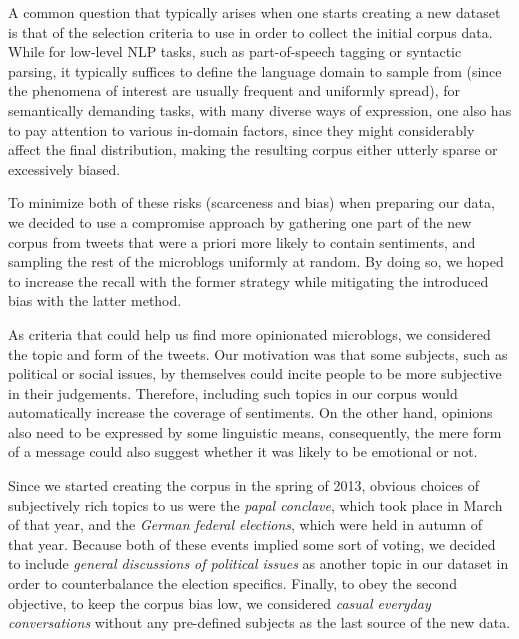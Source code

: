 A common question that typically arises when one starts creating a new
dataset is that of the selection criteria to use in order to collect
the initial corpus data.  While for low-level NLP tasks, such as
part-of-speech tagging or syntactic parsing, it typically suffices to
define the language domain to sample from (since the phenomena of
interest are usually frequent and uniformly spread), for semantically
demanding tasks, with many diverse ways of expression, one also has to
pay attention to various in-domain factors, since they might
considerably affect the final distribution, making the resulting
corpus either utterly sparse or excessively biased.

To minimize both of these risks (scarceness and bias) when preparing
our data, we decided to use a compromise approach by gathering one
part of the new corpus from tweets that were a priori more likely to
contain sentiments, and sampling the rest of the microblogs uniformly
at random.  By doing so, we hoped to increase the recall with the
former strategy while mitigating the introduced bias with the latter
method.

As criteria that could help us find more opinionated microblogs, we
considered the topic and form of the tweets.  Our motivation was that
some subjects, such as political or social issues, by themselves could
incite people to be more subjective in their judgements.  Therefore,
including such topics in our corpus would automatically increase the
coverage of sentiments.  On the other hand, opinions also need to be
expressed by some linguistic means, consequently, the mere form of a
message could also suggest whether it was likely to be emotional or
not.

Since we started creating the corpus in the spring of 2013, obvious
choices of subjectively rich topics to us were the \emph{papal
  conclave}, which took place in March of that year, and the
\emph{German federal elections}, which were held in autumn of that
year.  Because both of these events implied some sort of voting, we
decided to include \emph{general discussions of political issues} as
another topic in our dataset in order to counterbalance the election
specifics.  Finally, to obey the second objective, \ie{} to keep the
corpus bias low, we considered \emph{casual everyday conversations}
without any pre-defined subjects as the last source of the new data.

